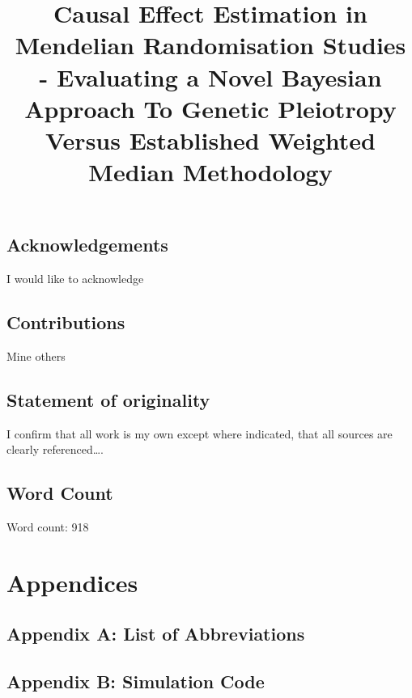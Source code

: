 \documentclass[
]{article}
\title{Causal Effect Estimation in Mendelian Randomisation Studies - Evaluating a Novel Bayesian Approach To Genetic Pleiotropy Versus Established Weighted Median Methodology}
\author{}
\date{\vspace{-2.5em}}
\begin{document}
\maketitle

{
\setcounter{tocdepth}{2}
\tableofcontents
}
\newpage

\subsection{Acknowledgements}\label{acknowledgements}

I would like to acknowledge

\subsection{Contributions}\label{contributions}

Mine others

\subsection{Statement of originality}\label{statement-of-originality}

I confirm that all work is my own except where indicated, that all sources are clearly referenced\ldots.

\subsection{Word Count}\label{word-count}

Word count:
918

\section{Appendices}\label{appendices}

\subsection{Appendix A: List of Abbreviations}\label{appendix-a-list-of-abbreviations}

\newpage

\subsection{Appendix B: Simulation Code}\label{appendix-b-simulation-code}
\end{document}
